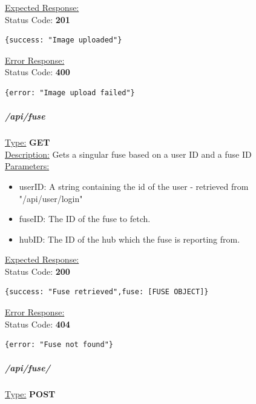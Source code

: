 \documentclass[preprint,12pt,3p]{elsarticle}
\newcommand{\forceindent}{\leavevmode{\parindent=1em\indent}}
\begin{document}
\underline{Expected Response:}\\[5pt]
\forceindent Status Code: \textbf{201} \\
\begin{verbatim}
{success: "Image uploaded"}
\end{verbatim}
\underline{Error Response:}\\[5pt]
\forceindent Status Code: \textbf{400} \\
\begin{verbatim}
{error: "Image upload failed"}
\end{verbatim}

\subparagraph*{/api/fuse}
\underline{Type:} \textbf{GET}\\

\underline{Description:} Gets a singular fuse based on a user ID and a fuse ID\\

\underline{Parameters:}
\begin{itemize}
\item userID: A string containing the id of the user - retrieved from "/api/user/login"

\item fuseID: The ID of the fuse to fetch.

\item hubID: The ID of the hub which the fuse is reporting from.

\end{itemize}

\underline{Expected Response:}\\[5pt]
\forceindent Status Code: \textbf{200} \\
\begin{verbatim}
{success: "Fuse retrieved",fuse: [FUSE OBJECT]}
\end{verbatim}
\underline{Error Response:}\\[5pt]
\forceindent Status Code: \textbf{404} \\
\begin{verbatim}
{error: "Fuse not found"}
\end{verbatim}

\subparagraph*{/api/fuse/}
\underline{Type:} \textbf{POST}\\
\end{document}

